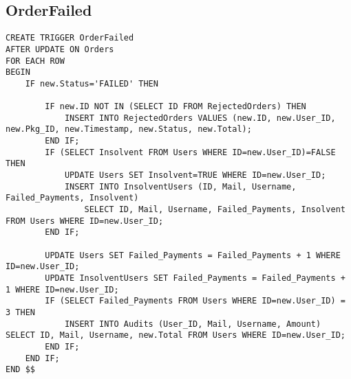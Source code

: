\subsection{OrderFailed}

\begin{lstlisting}[style=SQL]
CREATE TRIGGER OrderFailed
AFTER UPDATE ON Orders
FOR EACH ROW
BEGIN
    IF new.Status='FAILED' THEN

        IF new.ID NOT IN (SELECT ID FROM RejectedOrders) THEN
            INSERT INTO RejectedOrders VALUES (new.ID, new.User_ID, new.Pkg_ID, new.Timestamp, new.Status, new.Total);
        END IF;
        IF (SELECT Insolvent FROM Users WHERE ID=new.User_ID)=FALSE THEN
            UPDATE Users SET Insolvent=TRUE WHERE ID=new.User_ID;
            INSERT INTO InsolventUsers (ID, Mail, Username, Failed_Payments, Insolvent)
                SELECT ID, Mail, Username, Failed_Payments, Insolvent FROM Users WHERE ID=new.User_ID;
        END IF;

        UPDATE Users SET Failed_Payments = Failed_Payments + 1 WHERE ID=new.User_ID;
        UPDATE InsolventUsers SET Failed_Payments = Failed_Payments + 1 WHERE ID=new.User_ID;
        IF (SELECT Failed_Payments FROM Users WHERE ID=new.User_ID) = 3 THEN
            INSERT INTO Audits (User_ID, Mail, Username, Amount) SELECT ID, Mail, Username, new.Total FROM Users WHERE ID=new.User_ID;
        END IF;
    END IF;
END $$
\end{lstlisting}

\blindtext
